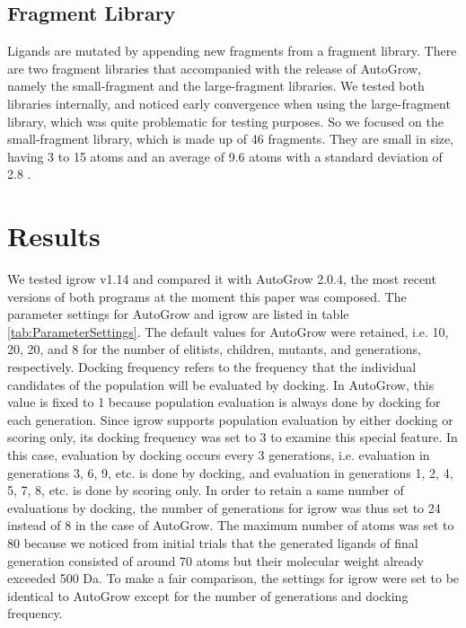 \documentclass[10pt,conference,letterpaper]{IEEEtran}
\begin{document}
\subsection{Fragment Library}
Ligands are mutated by appending new fragments from a fragment library.
There are two fragment libraries that accompanied with the release of AutoGrow, namely the small-fragment and the large-fragment libraries.
We tested both libraries internally, and noticed early convergence when using the large-fragment library, which was quite problematic for testing purposes.
So we focused on the small-fragment library, which is made up of 46 fragments.
They are small in size, having 3 to 15 atoms and an average of 9.6 atoms with a standard deviation of 2.8 \cite{RefWorks:114}.

\section{Results}\label{sec:results}
We tested igrow v1.14 and compared it with AutoGrow 2.0.4, the most recent versions of both programs at the moment this paper was composed.
The parameter settings for AutoGrow and igrow are listed in table \ref{tab:ParameterSettings}.
The default values for AutoGrow were retained, i.e. 10, 20, 20, and 8 for the number of elitists, children, mutants, and generations, respectively.
Docking frequency refers to the frequency that the individual candidates of the population will be evaluated by docking. In AutoGrow, this value is fixed to 1 because population evaluation is always done by docking for each generation. Since igrow supports population evaluation by either docking or scoring only, its docking frequency was set to 3 to examine this special feature. In this case, evaluation by docking occurs every 3 generations, i.e. evaluation in generations 3, 6, 9, etc. is done by docking, and evaluation in generations 1, 2, 4, 5, 7, 8, etc. is done by scoring only. In order to retain a same number of evaluations by docking, the number of generations for igrow was thus set to 24 instead of 8 in the case of AutoGrow.
The maximum number of atoms was set to 80 because we noticed from initial trials that the generated ligands of final generation consisted of around 70 atoms but their molecular weight already exceeded 500 Da.
To make a fair comparison, the settings for igrow were set to be identical to AutoGrow except for the number of generations and docking frequency.
\end{document}
